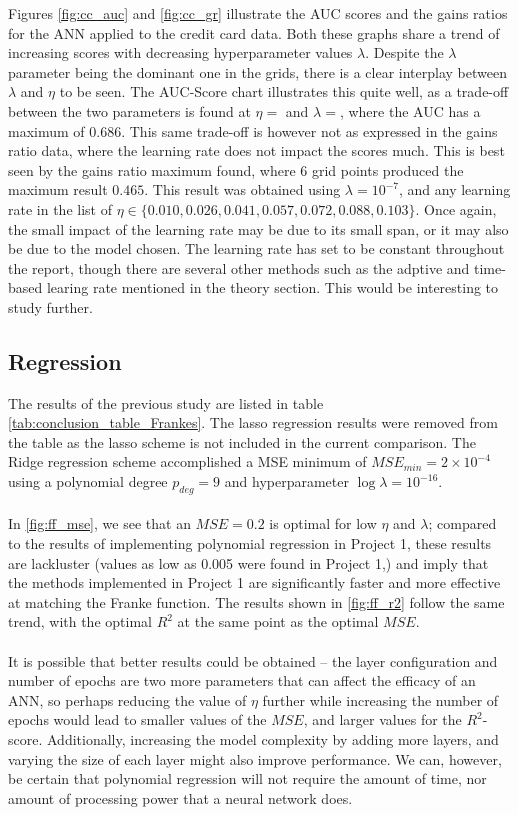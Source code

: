         Figures \ref{fig:cc_auc} and \ref{fig:cc_gr} illustrate the AUC scores and the gains ratios for the ANN applied to the credit card data. Both these graphs share a trend of increasing scores with decreasing hyperparameter values $\lambda$. Despite the $\lambda$ parameter being the dominant one in the grids, there is a clear interplay between $\lambda$ and $\eta$ to be seen. The AUC-Score chart illustrates this quite well, as a trade-off between the two parameters is found at $\eta=$ and $\lambda=$, where the AUC has a maximum of $0.686$. This same trade-off is however not as expressed in the gains ratio data, where the learning rate does not impact the scores much. This is best seen by the gains ratio maximum found, where 6 grid points produced the maximum result $0.465$. This result was obtained using $\lambda=10^{-7}$, and any learning rate in the list of $\eta \in \{ 0.010, 0.026, 0.041, 0.057, 0.072, 0.088, 0.103 \}$. Once again, the small impact of the learning rate may be due to its small span, or it may also be due to the model chosen. The learning rate has set to be constant throughout the report, though there are several other methods such as the adptive and time-based learing rate mentioned in the theory section. This would be interesting to study further.
            
    \subsection{Regression}
    	The results of the previous study are listed in table \ref{tab:conclusion_table_Frankes}. The lasso regression results were removed from the table as the lasso scheme is not included in the current comparison. The Ridge regression scheme accomplished a MSE minimum of $MSE_{min}= 2 \times 10^{-4}$ using a polynomial degree $p_{deg}=9$ and hyperparameter $\log\lambda=10^{-16}$. \\\\
		In \ref{fig:ff_mse}, we see that an $MSE = 0.2$ is optimal for low $\eta$ and $\lambda$; compared to the results of implementing polynomial regression in Project 1, these results are lackluster (values as low as 0.005 were found in Project 1,) and imply that the methods implemented in Project 1 are significantly faster and more effective at matching the Franke function.  The results shown in \ref{fig:ff_r2} follow the same trend, with the optimal $R^2$ at the same point as the optimal $MSE$. \\\\
		It is possible that better results could be obtained – the layer configuration and number of epochs are two more parameters that can affect the efficacy of an ANN, so perhaps reducing the value of $\eta$ further while increasing the number of epochs would lead to smaller values of the $MSE$, and larger values for the $R^2$-score.  Additionally, increasing the model complexity by adding more layers, and varying the size of each layer might also improve performance.  We can, however, be certain that polynomial regression will not require the amount of time, nor amount of processing power that a neural network does.
			
